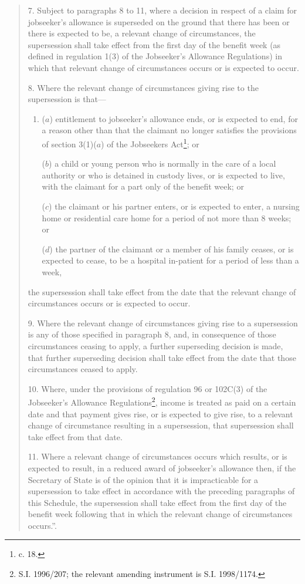 \documentclass[12pt,a4paper]{article}
\begin{document}
\begin{quotation}
7.  Subject to paragraphs 8 to 11, where a decision in respect of a claim for jobseeker’s allowance is superseded on the ground that there has been or there is expected to be, a relevant change of circumstances, the supersession shall take effect from the first day of the benefit week (as defined in regulation 1(3) of the Jobseeker’s Allowance Regulations) in which that relevant change of circumstances occurs or is expected to occur.

\medskip

8.  Where the relevant change of circumstances giving rise to the supersession is that—
\begin{enumerate}\item[]
($a$) entitlement to jobseeker’s allowance ends, or is expected to end, for a reason other than that the claimant no longer satisfies the provisions of section 3(1)($a$)  of the Jobseekers Act\footnote{ c. 18.}; or

($b$) a child or young person who is normally in the care of a local authority or who is detained in custody lives, or is expected to live, with the claimant for a part only of the benefit week; or

($c$) the claimant or his partner enters, or is expected to enter, a nursing home or residential care home for a period of not more than 8 weeks; or

($d$) the partner of the claimant or a member of his family ceases, or is expected to cease, to be a hospital in-patient for a period of less than a week,
\end{enumerate}
the supersession shall take effect from the date that the relevant change of circumstances occurs or is expected to occur.

\medskip

9.  Where the relevant change of circumstances giving rise to a supersession is any of those specified in paragraph 8, and, in consequence of those circumstances ceasing to apply, a further superseding decision is made, that further superseding decision shall take effect from the date that those circumstances ceased to apply.

\medskip

10.  Where, under the provisions of regulation 96 or 102C(3) of the Jobseeker’s Allowance Regulations\footnote{\frenchspacing S.I. 1996/207; the relevant amending instrument is S.I. 1998/1174.}, income is treated as paid on a certain date and that payment gives rise, or is expected to give rise, to a relevant change of circumstance resulting in a supersession, that supersession shall take effect from that date.

\medskip

11.  Where a relevant change of circumstances occurs which results, or is expected to result, in a reduced award of jobseeker’s allowance then, if the Secretary of State is of the opinion that it is impracticable for a supersession to take effect in accordance with the preceding paragraphs of this Schedule, the supersession shall take effect from the first day of the benefit week following that in which the relevant change of circumstances occurs.”.
\end{quotation}
\end{document}
